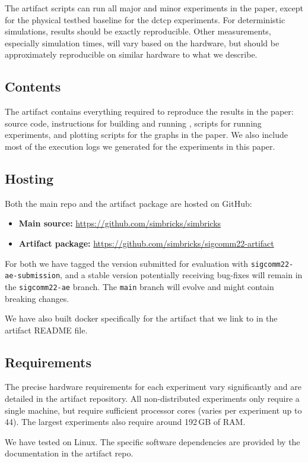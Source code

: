 The artifact scripts can run all major and minor experiments in
the paper, except for the physical testbed baseline for the dctcp
experiments.
%
For deterministic simulations, results should be exactly reproducible.
%
Other measurements, especially simulation times, will vary based on
the hardware, but should be approximately reproducible on
similar hardware to what we describe.

\subsection*{Contents}
The artifact contains everything required to reproduce the results in
the paper: source code, instructions for building and running
\sysname, scripts for running experiments, and plotting scripts for
the graphs in the paper. We also include most of the execution logs we
generated for the experiments in this paper.

\subsection*{Hosting}
Both the main \sysname repo and the artifact package are hosted on
GitHub:
\begin{itemize}
  \item \textbf{Main \sysname source:} \newline
    \url{https://github.com/simbricks/simbricks}
  \item \textbf{Artifact package:} \newline
    \url{https://github.com/simbricks/sigcomm22-artifact}
\end{itemize}

For both we have tagged the version submitted for evaluation with
\texttt{sigcomm22-ae-submission}, and a stable version potentially
receiving bug-fixes will remain in the \texttt{sigcomm22-ae} branch.
The \texttt{main} branch will evolve and might contain breaking
changes.

We have also built docker specifically for the artifact that we link to in the
artifact README file.

\subsection*{Requirements}
The precise hardware requirements for each experiment vary
significantly and are detailed in the artifact repository. All
non-distributed experiments only require a single machine, but require
sufficient processor cores (varies per experiment up to 44). The
largest experiments also require around 192\,GB of RAM.

We have tested \sysname on Linux. The specific software dependencies
are provided by the documentation in the artifact repo.
